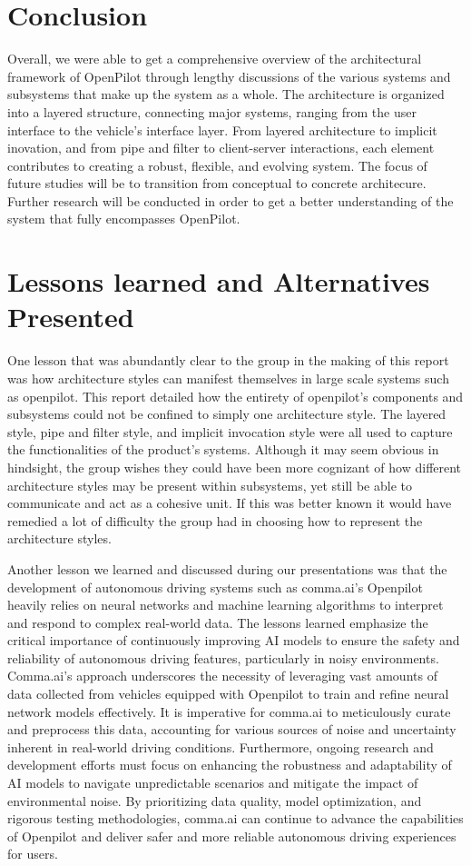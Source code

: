 \documentclass[12pt]{article}
\begin{document}
\section{Conclusion}
Overall, we were able to get a comprehensive overview of the architectural framework of OpenPilot through lengthy discussions of the various systems and subsystems that make up the system as a whole. The architecture is organized into a layered structure, connecting major systems, ranging from the user interface to the vehicle's interface layer. From layered architecture to implicit inovation, and from pipe and filter to client-server interactions, each element contributes to creating a robust, flexible, and evolving system. The focus of future studies will be to transition from conceptual to concrete architecure. Further research will be conducted in order to get a better understanding of the system that fully encompasses OpenPilot.


\section{Lessons learned and Alternatives Presented}

One lesson that was abundantly clear to the group in the making of this report was how architecture styles can manifest themselves in large scale systems such as openpilot. This report detailed how the entirety of openpilot's components and subsystems could not be confined to simply one architecture style. The layered style, pipe and filter style, and implicit invocation style were all used to capture the functionalities of the product's systems. Although it may seem obvious in hindsight, the group wishes they could have been more cognizant of how different architecture styles may be present within subsystems, yet still be able to communicate and act as a cohesive unit. If this was better known it would have remedied a lot of difficulty the group had in choosing how to represent the architecture styles.

Another lesson we learned and discussed during our presentations was that the development of autonomous driving systems such as comma.ai's Openpilot heavily relies on neural networks and machine learning algorithms to interpret and respond to complex real-world data. The lessons learned emphasize the critical importance of continuously improving AI models to ensure the safety and reliability of autonomous driving features, particularly in noisy environments. Comma.ai's approach underscores the necessity of leveraging vast amounts of data collected from vehicles equipped with Openpilot to train and refine neural network models effectively. It is imperative for comma.ai to meticulously curate and preprocess this data, accounting for various sources of noise and uncertainty inherent in real-world driving conditions. Furthermore, ongoing research and development efforts must focus on enhancing the robustness and adaptability of AI models to navigate unpredictable scenarios and mitigate the impact of environmental noise. By prioritizing data quality, model optimization, and rigorous testing methodologies, comma.ai can continue to advance the capabilities of Openpilot and deliver safer and more reliable autonomous driving experiences for users.
\end{document}
